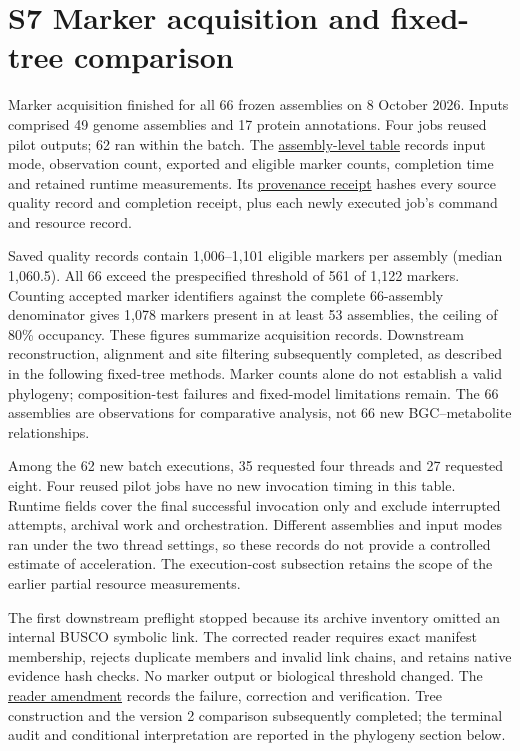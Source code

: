 \documentclass[
  10pt,
  a4paper,
]{article}
\begin{document}
\section{S7 Marker acquisition and fixed-tree comparison}\label{s7-marker-acquisition-and-fixed-tree-comparison}

Marker acquisition finished for all 66 frozen assemblies on 8 October 2026. Inputs comprised 49 genome assemblies and 17 protein annotations. Four jobs reused pilot outputs; 62 ran within the batch. The \href{https://github.com/vinvomero/fungallink-benchmark/blob/main/manuscript/tables/marker-batch-completion-2026-10-08.tsv}{assembly-level table} records input mode, observation count, exported and eligible marker counts, completion time and retained runtime measurements. Its \href{https://github.com/vinvomero/fungallink-benchmark/blob/main/manuscript/tables/marker-batch-completion-2026-10-08.json}{provenance receipt} hashes every source quality record and completion receipt, plus each newly executed job's command and resource record.

Saved quality records contain 1,006--1,101 eligible markers per assembly (median 1,060.5). All 66 exceed the prespecified threshold of 561 of 1,122 markers. Counting accepted marker identifiers against the complete 66-assembly denominator gives 1,078 markers present in at least 53 assemblies, the ceiling of 80\% occupancy. These figures summarize acquisition records. Downstream reconstruction, alignment and site filtering subsequently completed, as described in the following fixed-tree methods. Marker counts alone do not establish a valid phylogeny; composition-test failures and fixed-model limitations remain. The 66 assemblies are observations for comparative analysis, not 66 new BGC--metabolite relationships.

Among the 62 new batch executions, 35 requested four threads and 27 requested eight. Four reused pilot jobs have no new invocation timing in this table. Runtime fields cover the final successful invocation only and exclude interrupted attempts, archival work and orchestration. Different assemblies and input modes ran under the two thread settings, so these records do not provide a controlled estimate of acceleration. The execution-cost subsection retains the scope of the earlier partial resource measurements.

The first downstream preflight stopped because its archive inventory omitted an internal BUSCO symbolic link. The corrected reader requires exact manifest membership, rejects duplicate members and invalid link chains, and retains native evidence hash checks. No marker output or biological threshold changed. The \href{https://github.com/vinvomero/fungallink-benchmark/blob/main/protocol/decisions/2026-10-08-native-archive-reader-fix.md}{reader amendment} records the failure, correction and verification. Tree construction and the version 2 comparison subsequently completed; the terminal audit and conditional interpretation are reported in the phylogeny section below.
\end{document}
